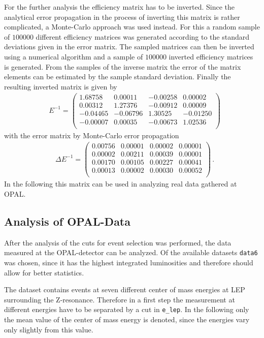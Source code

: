 \documentclass[11pt, a4paper]{article}
\numberwithin{equation}{section}
\begin{document}
For the further analysis the efficiency matrix has to be inverted.
Since the analytical error propagation in the process of inverting this matrix is rather complicated, a Monte-Carlo approach was used instead.
For this a random sample of $\num{100000}$ different efficiency matrices was generated according to the standard deviations given in the error matrix.
The sampled matrices can then be inverted using a numerical algorithm and a sample of $\num{100000}$ inverted efficiency matrices is generated.
From the samples of the inverse matrix the error of the matrix elements can be estimated by the sample standard deviation.
Finally the resulting inverted matrix is given by
\begin{align*}
&E^{-1} = \begin{pmatrix}
	1.68758 & 0.00011 &-0.00258 & 0.00002 \\
	0.00312 & 1.27376 &-0.00912 & 0.00009 \\
   -0.04465 &-0.06796 & 1.30525 &-0.01250 \\
   -0.00007 & 0.00035 &-0.00673 & 1.02536 \\
\end{pmatrix}
\end{align*}
with the error matrix by Monte-Carlo error propagation
\begin{align*}
&\Delta E^{-1} = \begin{pmatrix}
	0.00756 & 0.00001 & 0.00002 & 0.00001 \\
	0.00002 & 0.00211 & 0.00039 & 0.00001 \\
	0.00170 & 0.00105 & 0.00227 & 0.00041 \\
	0.00013 & 0.00002 & 0.00030 & 0.00052 \\
\end{pmatrix} \,\text{.}
\end{align*}
In the following this matrix can be used in analyzing real data gathered at OPAL.

\subsection{Analysis of OPAL-Data}
After the analysis of the cuts for event selection was performed, the data measured at the OPAL-detector can be analyzed.
Of the available datasets \texttt{data6} was chosen, since it has the highest integrated luminosities and therefore should allow for better statistics.

The dataset contains events at seven different center of mass energies at LEP surrounding the Z-resonance.
Therefore in a first step the measurement at different energies have to be separated by a cut in \texttt{e\_lep}.
In the following only the mean value of the center of mass energy is denoted, since the energies vary only slightly from this value.
\end{document}
